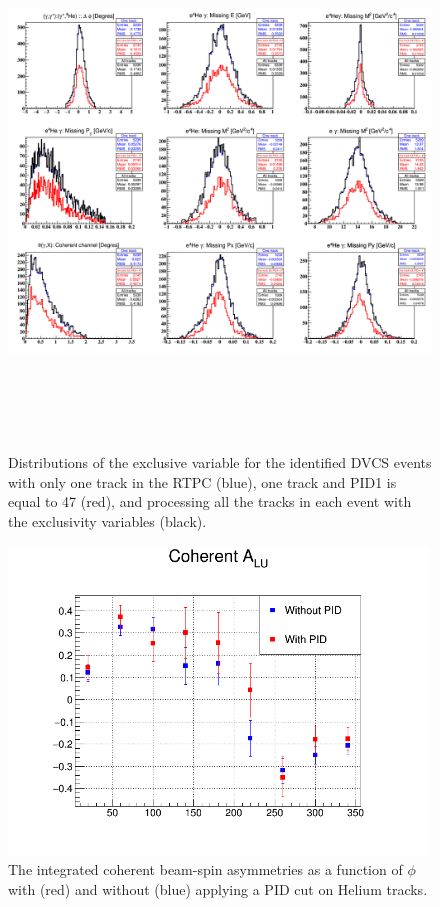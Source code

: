 \begin{figure}[tbp]
   \hspace{-0.5cm}
\includegraphics[height=14.2cm]{fig/all_incoh_exc_cuts.png}
\caption{Distributions of the exclusive variable for the identified DVCS events 
with only one track in the RTPC (blue), one track and PID1 is equal to 47 
(red), and processing all the tracks in each event with the exclusivity 
variables (black).}
\label{fig:all_incoh_exc_cuts}
\end{figure}

\begin{figure}[tbp]
   \centering
\includegraphics[height=8.2cm]{fig/Coh_ALU_W_out_PID.png}
\caption{The integrated coherent beam-spin asymmetries as a function of 
$\phi$ with (red) and without (blue) applying a PID cut on Helium tracks.}
\label{fig:coh_alu_PID}
\end{figure}


